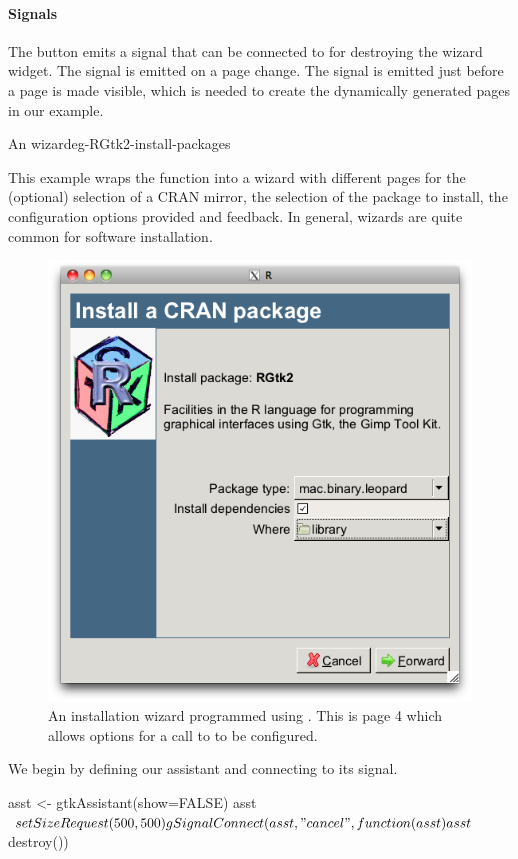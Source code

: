 \paragraph{Signals}
The  button emits a  signal that can be
connected to for destroying the wizard widget. The 
signal is emitted on a page change. The  signal is
emitted just before a page is made visible, which is needed to create
the dynamically generated pages in our example.

\begin{example}{An  wizard}{eg-RGtk2-install-packages}

This example wraps the  function into a
wizard with different pages for the (optional) selection of a CRAN
mirror, the selection of the package to install, the configuration
options provided and feedback. In general, wizards are quite common
for software installation.

\begin{figure}
  \centering
  \includegraphics[width=.6\textwidth]{fig-RGtk2-install-wizard.png}
  \caption{An installation wizard programmed using
    . This is page 4 which allows options for a
    call to  to be configured.}
  \label{fig:RGtk2-install-wizard}
\end{figure}


We begin by defining our assistant and connecting to its
 signal.
\begin{Schunk}
\begin{Sinput}
 asst <- gtkAssistant(show=FALSE)
 asst$setSizeRequest(500, 500)
 gSignalConnect(asst, "cancel", function(asst) asst$destroy())
\end{Sinput}
\end{Schunk}


\end{example}
